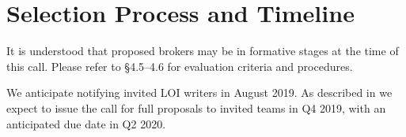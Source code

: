 \documentclass[DM,toc]{lsstdoc}
\begin{document}
\section{Selection Process and Timeline}

It is understood that proposed brokers may be in formative stages at the time of this call.
Please refer to  \S4.5--4.6 for evaluation criteria and procedures.

We anticipate notifying invited LOI writers in August 2019.
As described in  we expect to issue the call for full proposals to invited teams in Q4 2019, with an anticipated due date in Q2 2020.

%


\end{document}
